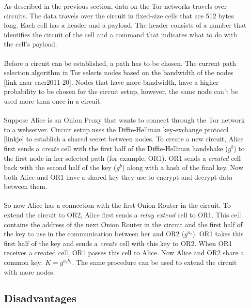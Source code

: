 \documentclass[journal]{IEEEtran}
\begin{document}
As described in the previous section, data on the Tor networks travels over circuits. The data travels over the circuit in fixed-size cells that are 512 bytes long. Each cell has a header and a payload. The header consists of a number that identifies the circuit of the cell and a command that indicates what to do with the cell’s payload.\\\\
Before a circuit can be established, a path has to be chosen. The current path selection algorithm in Tor selects nodes based on the bandwidth of the nodes [link naar cacr2011-20]. Nodes that have more bandwidth, have a higher probability to be chosen for the circuit setup, however, the same node can't be used more than once in a circuit.\\\\
Suppose Alice is an Onion Proxy that wants to connect through the Tor network to a webserver. Circuit setup uses the Diffie-Hellman key-exchange protocol [linkje] to establish a shared secret between nodes. To create a new circuit, Alice first sends a \emph{create} cell with the first half of the Diffie-Hellman handshake ($ g^b $) to the first node in her selected path (for example, OR1). OR1 sends a \emph{created} cell back with the second half of the key ($ g^b $) along with a hash of the final key. Now both Alice and OR1 have a shared key they use to encrypt and decrypt data between them.\\\\
So now Alice has a connection with the first Onion Router in the circuit. To extend the circuit to OR2, Alice first sends a \emph{relay extend} cell to OR1. This cell contains the address of the next Onion Router in the circuit and the first half of the key to use in the communication between her and OR2 ($ g^{a_2} $). OR1 takes this first half of the key and sends a \emph{create} cell with this key to OR2. When OR1 receives a created cell, OR1 passes this cell to Alice. Now Alice and OR2 share a common key: $ K = g^{a_2b_2} $. The same procedure can be used to extend the circuit with more nodes.

		\subsection{Disadvantages}
		
\end{document}
